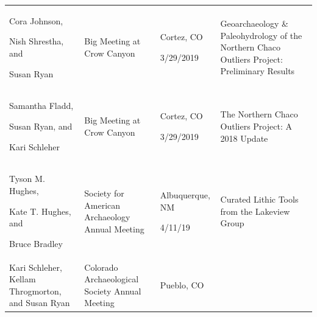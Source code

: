 \documentclass[
  12pt,
]{krantz}
\begin{document}
\begin{longtable}[]{@{}llll@{}}
\begin{minipage}[t]{0.21\columnwidth}
Cora Johnson,

Nish Shrestha,
and

Susan Ryan\strut
\end{minipage} & \begin{minipage}[t]{0.21\columnwidth}\raggedright
Big Meeting at
Crow Canyon\strut
\end{minipage} & \begin{minipage}[t]{0.21\columnwidth}\raggedright
Cortez, CO

3/29/2019\strut
\end{minipage} & \begin{minipage}[t]{0.21\columnwidth}\raggedright
Geoarchaeology
\&
Paleohydrology
of the
Northern Chaco
Outliers
Project:
Preliminary
Results\strut
\end{minipage}\tabularnewline
\begin{minipage}[t]{0.21\columnwidth}\raggedright
Samantha
Fladd,

Susan Ryan,
and

Kari Schleher\strut
\end{minipage} & \begin{minipage}[t]{0.21\columnwidth}\raggedright
Big Meeting at
Crow Canyon\strut
\end{minipage} & \begin{minipage}[t]{0.21\columnwidth}\raggedright
Cortez, CO

3/29/2019\strut
\end{minipage} & \begin{minipage}[t]{0.21\columnwidth}\raggedright
The Northern
Chaco Outliers
Project: A
2018 Update\strut
\end{minipage}\tabularnewline
\begin{minipage}[t]{0.21\columnwidth}\raggedright
Tyson M.
Hughes,

Kate T.
Hughes, and

Bruce Bradley\strut
\end{minipage} & \begin{minipage}[t]{0.21\columnwidth}\raggedright
Society for
American
Archaeology
Annual Meeting\strut
\end{minipage} & \begin{minipage}[t]{0.21\columnwidth}\raggedright
Albuquerque,
NM

4/11/19\strut
\end{minipage} & \begin{minipage}[t]{0.21\columnwidth}\raggedright
Curated Lithic
Tools from the
Lakeview Group\strut
\end{minipage}\tabularnewline
\begin{minipage}[t]{0.21\columnwidth}\raggedright
Kari Schleher,
Kellam
Throgmorton,
and Susan Ryan\strut
\end{minipage} & \begin{minipage}[t]{0.21\columnwidth}\raggedright
Colorado
Archaeological
Society Annual
Meeting\strut
\end{minipage} & \begin{minipage}[t]{0.21\columnwidth}\raggedright
Pueblo, CO


\end{minipage}
\end{longtable}
\end{document}
